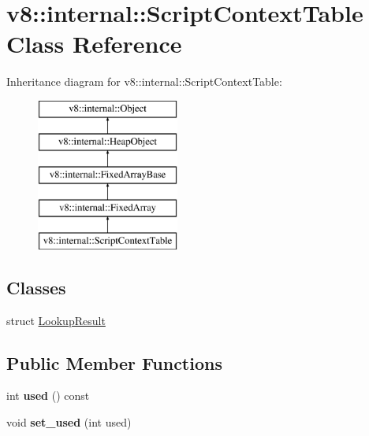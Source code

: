 \hypertarget{classv8_1_1internal_1_1_script_context_table}{}\section{v8\+:\+:internal\+:\+:Script\+Context\+Table Class Reference}
\label{classv8_1_1internal_1_1_script_context_table}
Inheritance diagram for v8\+:\+:internal\+:\+:Script\+Context\+Table\+:\begin{figure}[H]
\begin{center}
\leavevmode
\includegraphics[height=5.000000cm]{classv8_1_1internal_1_1_script_context_table}
\end{center}
\end{figure}
\subsection*{Classes}
\begin{DoxyCompactItemize}
\item 
struct \hyperlink{structv8_1_1internal_1_1_script_context_table_1_1_lookup_result}{Lookup\+Result}
\end{DoxyCompactItemize}
\subsection*{Public Member Functions}
\begin{DoxyCompactItemize}
\item 
int {\bfseries used} () const \hypertarget{classv8_1_1internal_1_1_script_context_table_a9a6d8acb56a4f1683b6864384915819d}{}\label{classv8_1_1internal_1_1_script_context_table_a9a6d8acb56a4f1683b6864384915819d}

\item 
void {\bfseries set\+\_\+used} (int used)\hypertarget{classv8_1_1internal_1_1_script_context_table_a622a9d87e83c5992b22af18d6263b1e3}{}\label{classv8_1_1internal_1_1_script_context_table_a622a9d87e83c5992b22af18d6263b1e3}

\end{DoxyCompactItemize}
